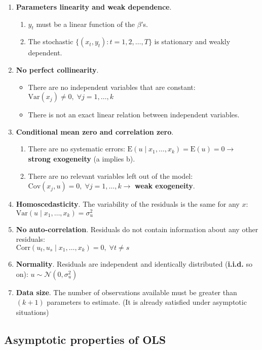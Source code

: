 \documentclass[10pt, a4paper, landscape]{extarticle}
\newcommand{\E}{\mathrm{E}}
\newcommand{\Var}{\mathrm{Var}}
\newcommand{\Cov}{\mathrm{Cov}}
\newcommand{\Corr}{\mathrm{Corr}}
\begin{document}
\begin{multicols}{3}
\begin{enumerate}[leftmargin=*, label=t\arabic*.]
	\item \textbf{Parameters linearity and weak dependence}.
	\begin{enumerate}[leftmargin=*, label=\alph*.]
		\item $y_t$ must be a linear function of the $\beta$'s.
		\item The stochastic $\lbrace(x_t, y_t) : t = 1, 2, \ldots, T\rbrace$ is stationary and weakly dependent.
	\end{enumerate}
	\item \textbf{No perfect collinearity}.
	\begin{itemize}[leftmargin=*]
		\item There are no independent variables that are constant: $\Var(x_j) \neq 0, \; \forall j = 1, \ldots, k$
		\item There is not an exact linear relation between independent variables.
	\end{itemize}
	\item \textbf{Conditional mean zero and correlation zero}.
	\begin{enumerate}[leftmargin=*, label=\alph*.]
		\item There are no systematic errors: $\E(u \mid x_1, \ldots, x_k) = \E(u) = 0 \rightarrow$ \textbf{strong exogeneity} (a implies b).
		\item There are no relevant variables left out of the model: $\Cov(x_j , u) = 0, \; \forall j = 1, \ldots, k \rightarrow$ \textbf{weak exogeneity}.
	\end{enumerate}
	\item \textbf{Homoscedasticity}. The variability of the residuals is the same for any $x$: $\Var(u \mid x_1, \ldots, x_k) = \sigma^2_u$
	\item \textbf{No auto-correlation}. Residuals do not contain information about any other residuals: \\ $\Corr(u_t, u_s \mid x_1, \ldots, x_k) = 0, \; \forall t \neq s$
	\item \textbf{Normality}. Residuals are independent and identically distributed (\textbf{i.i.d.} so on): $u \sim \mathcal{N} (0, \sigma^2_u)$
	\item \textbf{Data size}. The number of observations available must be greater than $(k + 1)$ parameters to estimate. (It is already satisfied under asymptotic situations)
\end{enumerate}

\subsection*{Asymptotic properties of OLS}


\end{multicols}
\end{document}
